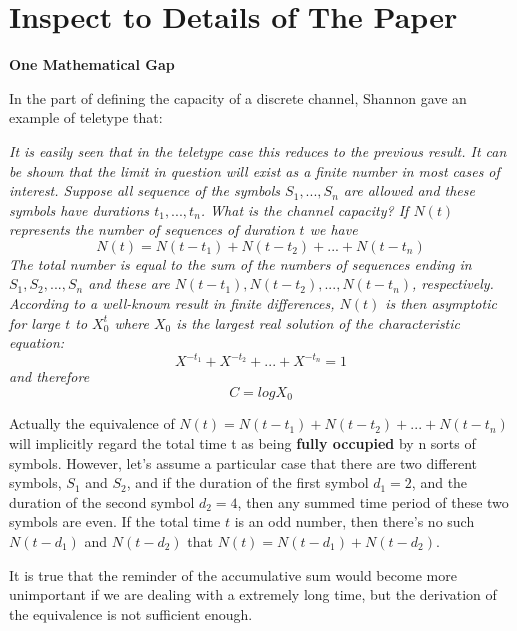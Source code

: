 \documentclass[12pt]{article}
\begin{document}
		\section{Inspect to Details of The Paper}
		\textbf{One Mathematical Gap} \par
		In the part of defining the capacity of a discrete channel, Shannon gave an example of teletype that:
		\\
		\par
		\textit{It is easily seen that in the teletype case this reduces to the previous result. It can be shown that the limit in question will exist as a finite number in most cases of interest. Suppose all sequence of the symbols $S_1,...,S_n$ are allowed and these symbols have durations $t_1,...,t_n$. What is the channel capacity? If $N(t)$ represents the number of sequences of duration $t$ we have $$N(t) = N(t-t_1)+N(t-t_2)+...+N(t-t_n)$$ The total number is equal to the sum of the numbers of sequences ending in $S_1,S_2,...,S_n$ and these are $N(t-t_1),N(t-t_2),...,N(t-t_n)$, respectively. According to a well-known result in finite differences, $N(t)$ is then asymptotic for large $t$ to $X_0^t$ where $X_0$ is the largest real solution of the characteristic equation: $$X^{-t_1}+X^{-t_2}+...+X^{-t_n} = 1$$ and therefore $$C = logX_0$$}
		
		Actually the equivalence of $N(t) = N(t-t_1)+N(t-t_2)+...+N(t-t_n)$ will implicitly regard the total time t as being \textbf{fully occupied} by n sorts of symbols. However, let's assume a particular case that there are two different symbols, $S_1$ and $S_2$, and if the duration of the first symbol $d_1 = 2$, and the duration of the second symbol $d_2 = 4$, then any summed time period of these two symbols are even. If the total time $t$ is an odd number, then there's no such $N(t-d_1)$ and $N(t-d_2)$ that $N(t) = N(t-d_1) + N(t-d_2)$. \par 
		
		It is true that the reminder of the accumulative sum would become more unimportant if we are dealing with a extremely long time, but the derivation of the equivalence is not sufficient enough.\par 
		
		
\end{document}
